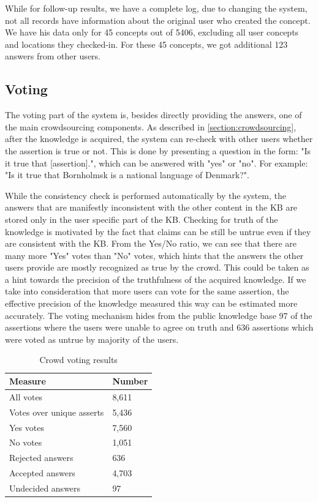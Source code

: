 {While for follow-up results, we have a complete log, due to changing the 
system, not all records have information about the original user who created 
the concept. We have his data only for 45 concepts out of 5406, excluding all 
user concepts and locations they checked-in. For these 45 concepts, 
we got additional 123 answers from other users.

\subsection{Voting}
\label{section:resultsvoting}
The voting part of the system is, besides directly providing the answers, 
one of the main crowdsourcing components. As described in 
\autoref{section:crowdsourcing}, 
after the knowledge is acquired, the system can re-check with other users 
whether the assertion is true or not. This is done by presenting a question in 
the form: "Is it true that [assertion].", which can be answered with "yes" or 
"no". For example: "Is it true that Bornholmsk is a national language of 
Denmark?".

While the consistency check is performed automatically by the system, the 
answers that are manifestly inconsistent with the other content in the KB are 
stored only in the user specific part of the KB. Checking for truth of the 
knowledge is motivated by the fact that claims can be still be untrue even if 
they are consistent with the KB. From the Yes/No ratio, we can see that there 
are many more "Yes" votes than "No" votes, which hints that the answers the 
other users provide are mostly recognized as true by the crowd. 
This could be taken as a hint towards the precision of the truthfulness of the 
acquired knowledge. If we take into consideration that more users can vote for 
the same assertion, the effective precision of the knowledge measured this way 
can be estimated more accurately. The voting mechanism hides from the public 
knowledge base 97 of the assertions where the users were unable to agree on 
truth and 636 assertions which were voted as untrue by majority of the users.

\begin{table}[h]
\centering
\caption{Crowd voting results}
\label{tab:votingresults}
\begin{tabular}{|l|l|}
	\hline
	\textbf{Measure}  & \textbf{Number} \\
    \hline
    All votes & 8,611 \\
    \hline
    Votes over unique asserts & 5,436 \\
    \hline
    Yes votes & 7,560 \\
    \hline
    No votes & 1,051 \\
    \hline
    Rejected answers & 636 \\
    \hline
    Accepted answers & 4,703 \\
    \hline
    Undecided answers & 97 \\
    \hline
\end{tabular}
\end{table}

}
